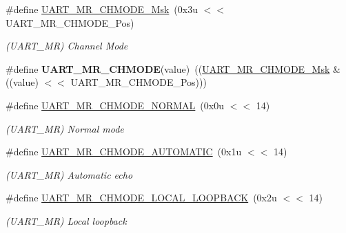 \begin{DoxyCompactItemize}
\#define \mbox{\hyperlink{group__SAMV71__UART_gaae4c24ca9b88ad0fcc45c6525705d23c}{U\+A\+R\+T\+\_\+\+M\+R\+\_\+\+C\+H\+M\+O\+D\+E\+\_\+\+Msk}}~(0x3u $<$$<$ U\+A\+R\+T\+\_\+\+M\+R\+\_\+\+C\+H\+M\+O\+D\+E\+\_\+\+Pos)
\begin{DoxyCompactList}\small\item\em (U\+A\+R\+T\+\_\+\+MR) Channel Mode \end{DoxyCompactList}\item 
\mbox{\label{group__SAMV71__UART_gab5b8bfa6c86afa2918bdc585823ae86f}} 
\#define {\bfseries U\+A\+R\+T\+\_\+\+M\+R\+\_\+\+C\+H\+M\+O\+DE}(value)~((\mbox{\hyperlink{group__SAMV71__UART_gaae4c24ca9b88ad0fcc45c6525705d23c}{U\+A\+R\+T\+\_\+\+M\+R\+\_\+\+C\+H\+M\+O\+D\+E\+\_\+\+Msk}} \& ((value) $<$$<$ U\+A\+R\+T\+\_\+\+M\+R\+\_\+\+C\+H\+M\+O\+D\+E\+\_\+\+Pos)))
\item 
\mbox{\label{group__SAMV71__UART_ga2761793c6a7ac89444965deb9147b9c7}} 
\#define \mbox{\hyperlink{group__SAMV71__UART_ga2761793c6a7ac89444965deb9147b9c7}{U\+A\+R\+T\+\_\+\+M\+R\+\_\+\+C\+H\+M\+O\+D\+E\+\_\+\+N\+O\+R\+M\+AL}}~(0x0u $<$$<$ 14)
\begin{DoxyCompactList}\small\item\em (U\+A\+R\+T\+\_\+\+MR) Normal mode \end{DoxyCompactList}\item 
\mbox{\label{group__SAMV71__UART_ga3e7e86c1dbd250fe7a0edd0a0bf712d1}} 
\#define \mbox{\hyperlink{group__SAMV71__UART_ga3e7e86c1dbd250fe7a0edd0a0bf712d1}{U\+A\+R\+T\+\_\+\+M\+R\+\_\+\+C\+H\+M\+O\+D\+E\+\_\+\+A\+U\+T\+O\+M\+A\+T\+IC}}~(0x1u $<$$<$ 14)
\begin{DoxyCompactList}\small\item\em (U\+A\+R\+T\+\_\+\+MR) Automatic echo \end{DoxyCompactList}\item 
\mbox{\label{group__SAMV71__UART_gaccdee7be5b1c4193e9b5db7a4470af3d}} 
\#define \mbox{\hyperlink{group__SAMV71__UART_gaccdee7be5b1c4193e9b5db7a4470af3d}{U\+A\+R\+T\+\_\+\+M\+R\+\_\+\+C\+H\+M\+O\+D\+E\+\_\+\+L\+O\+C\+A\+L\+\_\+\+L\+O\+O\+P\+B\+A\+CK}}~(0x2u $<$$<$ 14)
\begin{DoxyCompactList}\small\item\em (U\+A\+R\+T\+\_\+\+MR) Local loopback \end{DoxyCompactList}\item 
$$
\end{DoxyCompactItemize}
